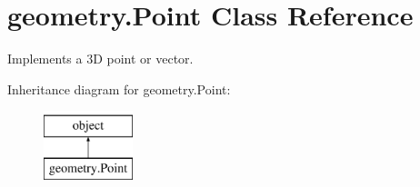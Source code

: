 \hypertarget{classgeometry_1_1Point}{}\section{geometry.\+Point Class Reference}
\label{classgeometry_1_1Point}


Implements a 3D point or vector.  


Inheritance diagram for geometry.\+Point\+:\begin{figure}[H]
\begin{center}
\leavevmode
\includegraphics[height=2.000000cm]{classgeometry_1_1Point}
\end{center}
\end{figure}
